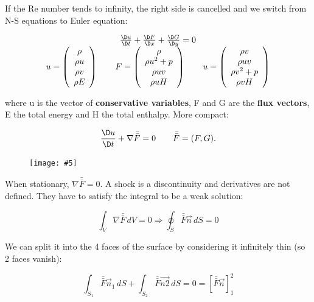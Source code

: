 \documentclass[british,french,11pt, a4paper, openany]{article}
\newcommand{\wrapfig}[6]{%
	\begin{figure}%
		\vspace{-5mm}%
		\texttt{[image: \#5]}%
		\captionof{figure}{}%
		\label{#6}%
	\end{figure}%
}
\begin{document}
If the Re number tends to infinity, the right side is cancelled and we switch from N-S equations to Euler equation:

\begin{equation}
\begin{array}{c}
\frac{\D u}{\D t} + \frac{\D F}{\D x} + \frac{\D G}{\D y} = 0 \\
u= \left( \begin{array}{c}
\rho \\
\rho u\\
\rho v\\
\rho E
\end{array}
\right)
\qquad 
F= \left( \begin{array}{c}
\rho \\
\rho u^2 + p\\
\rho uv\\
\rho uH
\end{array}
\right)
\qquad 
u= \left( \begin{array}{c}
\rho v\\
\rho uv\\
\rho v^2 +p\\
\rho vH
\end{array}
\right)
\end{array}
\end{equation}

where u is the vector of \textbf{conservative variables}, F and G are the \textbf{flux vectors}, E the total energy and H the total enthalpy. More compact: 

\begin{equation}
\frac{\D  u}{\D t} + \nabla \bar{\bar{F}} = 0 \qquad \bar{\bar{F}} = (F,G).
\end{equation}

\wrapfig{10}{l}{5}{0.5}{ch8/1}{ch8/1}
When stationary, $\nabla \bar{\bar{F}} = 0$. A shock is a discontinuity and derivatives are not defined. They have to satisfy the integral to be a weak solution: 

\begin{equation}
\int _V \nabla \bar{\bar{F}}\, dV = 0 \Rightarrow \oint _S \bar{\bar{F}}\vec{n} \, dS= 0
\end{equation}

We can split it into the 4 faces of the surface by considering it infinitely thin (so 2 faces vanish): 

\begin{equation}
\int _{S_1} \bar{\bar{F}}\vec{n}_1 \, dS + \int _{S_2} \bar{\bar{F}}\vec{n2} \, dS = 0 = [\bar{\bar{F}}\vec{n}]_1^2
\end{equation}
\end{document}
